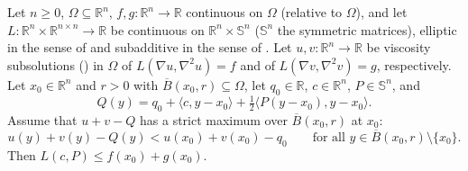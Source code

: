 \begin{lemma}
Let $n\ge0$, $\Omega\subseteq\mathbb R^n$, $f,g:\mathbb R^n\to\mathbb R$ continuous on $\Omega$ (relative to $\Omega$), and let $L:\mathbb R^n\times\mathbb R^{n\times n}\to\mathbb R$ be continuous on $\mathbb R^n\times\mathbb S^n$ ($\mathbb S^n$ the symmetric matrices), elliptic in the sense of  and subadditive in the sense of . Let $u,v:\mathbb R^n\to\mathbb R$ be viscosity subsolutions () in $\Omega$ of $L(\nabla u,\nabla^2u)=f$ and of $L(\nabla v,\nabla^2v)=g$, respectively. Let $x_0\in\mathbb R^n$ and $r>0$ with $\overline B(x_0,r)\subseteq\Omega$, let $q_0\in\mathbb R$, $c\in\mathbb R^n$, $P\in\mathbb S^n$, and
\[
Q(y)=q_0+\langle c,y-x_0\rangle+\tfrac12\langle P(y-x_0),y-x_0\rangle .
\]
Assume that $u+v-Q$ has a strict maximum over $\overline B(x_0,r)$ at $x_0$:
\[
u(y)+v(y)-Q(y)<u(x_0)+v(x_0)-q_0\qquad\text{for all }y\in\overline B(x_0,r)\setminus\{x_0\}.
\]
Then $L(c,P)\le f(x_0)+g(x_0)$.
\end{lemma}
